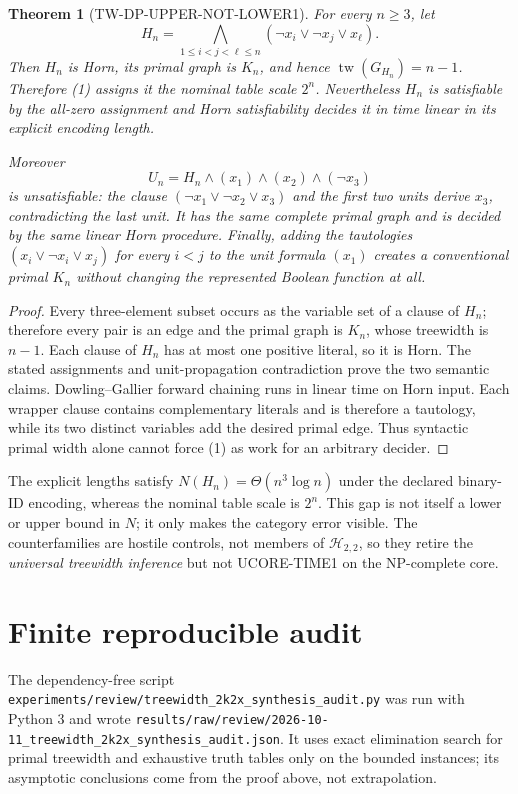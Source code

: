 \documentclass[11pt]{article}
\newtheorem{theorem}{Theorem}
\newcommand{\tw}{\operatorname{tw}}
\begin{document}
\begin{theorem}[TW-DP-UPPER-NOT-LOWER1]
For every $n\ge 3$, let
\[
 H_n=\bigwedge_{1\le i<j<\ell\le n}
       (\neg x_i\vee\neg x_j\vee x_\ell).
\]
Then $H_n$ is Horn, its primal graph is $K_n$, and hence
$\tw(G_{H_n})=n-1$.  Therefore (1) assigns it the nominal table scale $2^n$.
Nevertheless $H_n$ is satisfiable by the all-zero assignment and Horn
satisfiability decides it in time linear in its explicit encoding length.

Moreover
\[
 U_n=H_n\wedge(x_1)\wedge(x_2)\wedge(\neg x_3)
\]
is unsatisfiable: the clause
$(\neg x_1\vee\neg x_2\vee x_3)$ and the first two units derive $x_3$,
contradicting the last unit.  It has the same complete primal graph and is
decided by the same linear Horn procedure.  Finally, adding the tautologies
$(x_i\vee\neg x_i\vee x_j)$ for every $i<j$ to the unit formula $(x_1)$
creates a conventional primal $K_n$ without changing the represented Boolean
function at all.
\end{theorem}
\begin{proof}
Every three-element subset occurs as the variable set of a clause of $H_n$;
therefore every pair is an edge and the primal graph is $K_n$, whose treewidth
is $n-1$.  Each clause of $H_n$ has at most one positive literal, so it is
Horn.  The stated assignments and unit-propagation contradiction prove the
two semantic claims.  Dowling--Gallier forward chaining runs in linear time
on Horn input.  Each wrapper clause contains complementary literals and is
therefore a tautology, while its two distinct variables add the desired
primal edge.  Thus syntactic primal width alone cannot force (1) as work for
an arbitrary decider.
\end{proof}

The explicit lengths satisfy $N(H_n)=\Theta(n^3\log n)$ under the declared
binary-ID encoding, whereas the nominal table scale is $2^n$.  This gap is
not itself a lower or upper bound in $N$; it only makes the category error
visible.  The counterfamilies are hostile controls, not members of
$\mathcal H_{2,2}$, so they retire the \emph{universal treewidth inference}
but not UCORE-TIME1 on the NP-complete core.

\section{Finite reproducible audit}
The dependency-free script
\texttt{experiments/review/treewidth\_2k2x\_synthesis\_audit.py} was run with
Python 3 and wrote
\texttt{results/raw/review/2026-10-11\_treewidth\_2k2x\_synthesis\_audit.json}.
It uses exact elimination search for primal treewidth and exhaustive truth
tables only on the bounded instances; its asymptotic conclusions come from
the proof above, not extrapolation.
\end{document}
